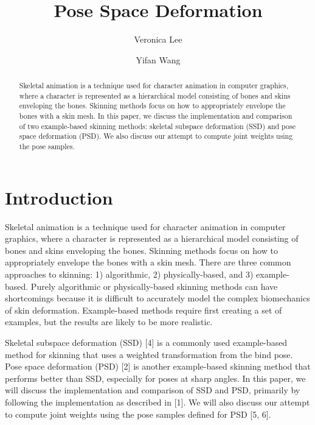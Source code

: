 \documentclass[10pt,twocolumn,letterpaper]{article}
\begin{document}
\title{Pose Space Deformation}

\author{Veronica Lee\\
\and
Yifan Wang\\
}

\maketitle

\begin{abstract}
Skeletal animation is a technique used for character animation in computer graphics, where a character is represented as a hierarchical model consisting of bones and skins enveloping the bones. Skinning methods focus on how to appropriately envelope the bones with a skin mesh. In this paper, we discuss the implementation and comparison of two example-based skinning methods: skeletal subspace deformation (SSD) and pose space deformation (PSD). We also discuss our attempt to compute joint weights using the pose samples.
\end{abstract}

\section{Introduction}

Skeletal animation is a technique used for character animation in computer graphics, where a character is represented as a hierarchical model consisting of bones and skins enveloping the bones. Skinning methods focus on how to appropriately envelope the bones with a skin mesh. There are three common approaches to skinning: 1) algorithmic, 2) physically-based, and 3) example-based. Purely algorithmic or physically-based skinning methods can have shortcomings because it is difficult to accurately model the complex biomechanics of skin deformation. Example-based methods require first creating a set of examples, but the results are likely to be more realistic.

Skeletal subspace deformation (SSD) [4] is a commonly used example-based method for skinning that uses a weighted transformation from the bind pose. Pose space deformation (PSD) [2] is another example-based skinning method that  performs better than SSD, especially for poses at sharp angles. In this paper, we will discuss the implementation and comparison of SSD and PSD, primarily by following the implementation as described in [1]. We will also discuss our attempt to compute joint weights using the pose samples defined for PSD [5, 6].
\end{document}
